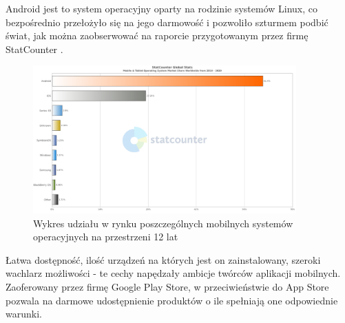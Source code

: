 \documentclass[12pt, a4paper]{article}
\begin{document}
\begin{sloppypar}
{{    Android jest to system operacyjny oparty na rodzinie systemów Linux, co bezpośrednio
    przełożyło się na jego darmowość i pozwoliło szturmem podbić świat, jak można
    zaobserwować na raporcie przygotowanym przez firmę StatCounter \cite{os}.
    \begin{figure}[H]
      \centering
      \includegraphics[width=0.9\textwidth]{android_chart.png}
      \caption{Wykres udziału w rynku poszczególnych mobilnych systemów operacyjnych na przestrzeni 12 lat}
      \label{fig:android}
    \end{figure}
    Łatwa dostępność, ilość urządzeń na których jest on zainstalowany, szeroki wachlarz
    możliwości - te cechy napędzały ambicje twórców aplikacji mobilnych. Zaoferowany
    przez firmę Google Play Store, w przeciwieństwie do App Store pozwala na darmowe
    udostępnienie produktów o ile spełniają one odpowiednie warunki.

}}
\end{sloppypar}
\end{document}
